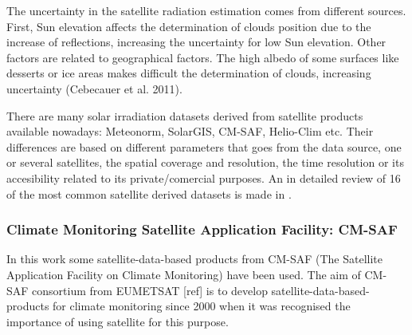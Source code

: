 The uncertainty in the satellite radiation estimation comes from different sources. First, Sun elevation affects the determination of clouds position due to the increase of reflections, increasing  the uncertainty for low Sun elevation. Other factors are related to geographical factors. The high albedo of some surfaces like desserts or ice areas makes difficult the determination of clouds, increasing uncertainty (Cebecauer et al. 2011).

There are many solar irradiation datasets derived from satellite products available nowadays: Meteonorm, SolarGIS, CM-SAF, Helio-Clim etc. Their differences are based on different parameters that goes from the data source, one or several satellites, the spatial coverage and resolution, the time resolution or its accesibility related to its private/comercial purposes. An in detailed review of 16 of the most common satellite derived datasets is made in \cite*{Vernay2014}.

 

\subsubsection{Climate Monitoring Satellite Application Facility: CM-SAF}

In this work some satellite-data-based products from CM-SAF (The Satellite Application Facility on Climate Monitoring) have been used. The aim of CM-SAF consortium from EUMETSAT [ref] is to develop satellite-data-based-products for climate monitoring since 2000 when it was recognised the importance of using satellite for this purpose.

